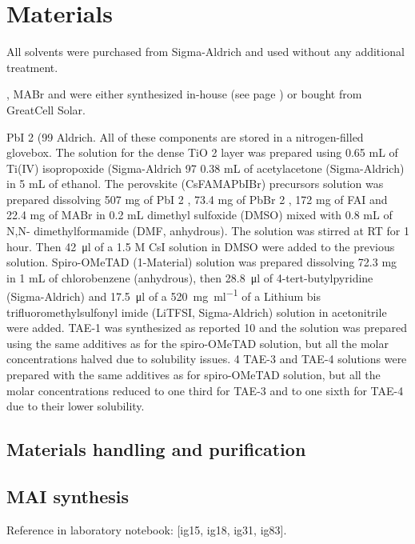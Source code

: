 \section{Materials}

All solvents were purchased from Sigma-Aldrich and used without any additional treatment.

,  MABr and  were either synthesized in-house (see page \pageref{methods-MAI}) or bought from GreatCell Solar.

 PbI 2 (99 %
Aldrich. All of these components are stored in a nitrogen-filled glovebox. The solution for the
dense TiO 2 layer was prepared using 0.65 mL of Ti(IV) isopropoxide (Sigma-Aldrich 97 %
0.38 mL of acetylacetone (Sigma-Aldrich) in 5 mL of ethanol. The perovskite (CsFAMAPbIBr)
precursors solution was prepared dissolving 507 mg of PbI 2 , 73.4 mg of PbBr 2 , 172 mg of FAI
and 22.4 mg of MABr in 0.2 mL dimethyl sulfoxide (DMSO) mixed with 0.8 mL of N,N-
dimethylformamide (DMF, anhydrous). The solution was stirred at RT for 1 hour. Then \SI{42}{\micro\litre} of
a 1.5 M CsI solution in DMSO were added to the previous solution. Spiro-OMeTAD (1-Material)
solution was prepared dissolving 72.3 mg in 1 mL of chlorobenzene (anhydrous), then \SI{28.8}{\micro\litre}
of 4-tert-butylpyridine (Sigma-Aldrich) and \SI{17.5}{\micro\litre} of a \SI{520}{\milli\gram\per\milli\litre} of a Lithium bis
trifluoromethylsulfonyl imide (LiTFSI, Sigma-Aldrich) solution in acetonitrile were added. TAE-1
was synthesized as reported 10 and the solution was prepared using the same additives as for
the spiro-OMeTAD solution, but all the molar concentrations halved due to solubility issues.
4
TAE-3 and TAE-4 solutions were prepared with the same additives as for spiro-OMeTAD
solution, but all the molar concentrations reduced to one third for TAE-3 and to one sixth for
TAE-4 due to their lower solubility.

\subsection{Materials handling and purification}


	\subsection{MAI synthesis}\label{methods-MAI}
	
		Reference in laboratory notebook: [ig15, ig18, ig31, ig83].
		
